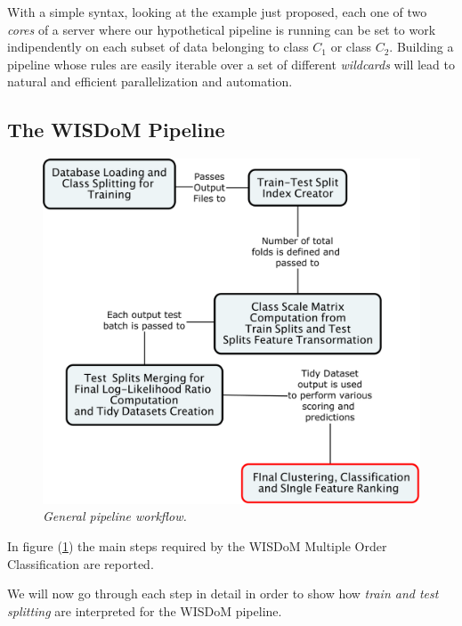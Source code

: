 \documentclass[12pt,openright,twoside,a4paper]{book}
\begin{document}
With a simple syntax, looking at the example just proposed, each one of two \textit{cores} of a server where our hypothetical pipeline is running can be set to work indipendently on each subset of data belonging to class $C_1$ or class $C_2$.
Building a pipeline whose rules are easily iterable over a set of different \textit{wildcards} will lead to natural and efficient parallelization and automation.
\clearpage
\subsection{The WISDoM Pipeline}

\begin{figure}[!h]
\centering
\includegraphics[scale=0.3]{General-Pipeline}
\caption{\textit{General pipeline workflow.}}
\label{gpipe}
\end{figure}

In figure (\ref{gpipe}) the main steps required by the WISDoM Multiple Order Classification are reported.

We will now go through each step in detail in order to show how \textit{train and test splitting} are interpreted for the WISDoM pipeline.
\end{document}
